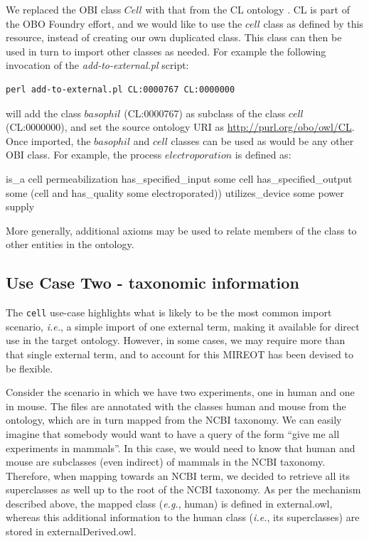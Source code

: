 \documentclass{ao2e}%
\begin{document}
We replaced the \ac{OBI} class $Cell$ with that from the \ac{CL} ontology \cite{CL}. 
\ac{CL} is part of the \ac{OBO} Foundry effort, and we would like to use the $cell$ class as defined by this resource, instead of creating our own duplicated class.
This class can then be used in turn to import other classes as needed.
For example the following invocation of the \emph{add-to-external.pl} script:

\begin{footnotesize}
\begin{verbatim}
perl add-to-external.pl CL:0000767 CL:0000000 
\end{verbatim}
\end{footnotesize}

will add the class $basophil$ (CL:0000767) as subclass of the class $cell$  (CL:0000000), and set the source ontology URI as \url{http://purl.org/obo/owl/CL}.
Once imported, the $basophil$ and $cell$ classes can be used as would be any other OBI class. For example, the process $electroporation$ is defined as:

\begin{footnotesize}
\begin{verbatimtab}
is_a cell permeabilization
has_specified_input some cell
has_specified_output some 
   (cell and has_quality some electroporated))
utilizes_device some power supply
\end{verbatimtab}
\end{footnotesize}

More generally, additional axioms may be used to relate members of the class to other entities in the ontology.


\subsection*{Use Case Two - taxonomic information}

The \texttt{cell} use-case highlights what is likely to be the most common import scenario, \emph{i.e.}, a simple import of one external term, making it available for direct use in the target ontology.
However, in some cases, we may require more than that single external term, and to account for this \ac{MIREOT} has been devised to be flexible.

Consider the scenario in which we have two experiments, one in human and one in mouse. 
The files are annotated with the classes human and mouse from the ontology, which are in turn mapped from the NCBI taxonomy. 
We can easily imagine that somebody would want to have a query of the form ``give me all 
experiments in mammals''. In this case, we would need to know that human and mouse are 
subclasses (even indirect) of mammals in the NCBI taxonomy. Therefore, when mapping 
towards an NCBI term, we decided to retrieve all its superclasses as well up to the root of the 
NCBI taxonomy. As per the mechanism described above, the mapped class (\emph{e.g.}, human) is 
defined in external.owl, whereas this additional information to the human class (\emph{i.e.}, its 
superclasses) are stored in externalDerived.owl. 
\end{document}

